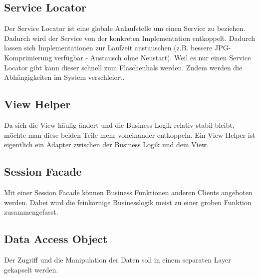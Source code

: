\subsection{Service Locator}

Der Service Locator ist eine globale Anlaufstelle um einen Service zu beziehen. Dadurch wird der Service von der konkreten Implementation entkoppelt. Dadurch lassen sich Implementationen zur Laufzeit austauschen (z.B. bessere JPG-Komprimierung verfügbar - Austausch ohne Neustart). Weil es nur einen Service Locator gibt kann dieser schnell zum Flaschenhals werden. Zudem werden die Abhängigkeiten im System verschleiert.

\subsection{View Helper}

Da sich die View häufig ändert und die Business Logik relativ stabil bleibt, möchte man diese beiden Teile mehr voneinander entkoppeln. Ein View Helper ist eigentlich ein Adapter zwischen der Business Logik und dem View.

\subsection{Session Facade}

Mit einer Session Facade können Business Funktionen anderen Clients angeboten werden. Dabei wird die feinkörnige Businesslogik meist zu einer groben Funktion zusammengefasst.

\subsection{Data Access Object}

Der Zugriff und die Manipulation der Daten soll in einem separaten Layer gekapselt werden. 